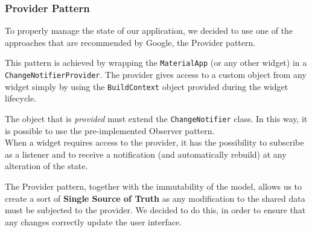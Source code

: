 \subsubsection{Provider Pattern}
\label{provider}
To properly manage the state of our application, we decided to use one of the approaches that are recommended by Google, the Provider pattern.

This pattern is achieved by wrapping the \texttt{MaterialApp} (or any other widget) in a \texttt{ChangeNotifierProvider}.
The provider gives access to a custom object from any widget simply by using the \texttt{BuildContext} object provided during the widget lifecycle.

The object that is \emph{provided} must extend the \texttt{ChangeNotifier} class. In this way, it is possible to use the pre-implemented Observer pattern.\\
When a widget requires access to the provider, it has the possibility to subscribe as a listener and to receive a notification (and automatically rebuild) at any alteration of the state.

The Provider pattern, together with the immutability of the model, allows us to create a sort of \textbf{Single Source of Truth} as any modification to the shared data must be subjected to the provider.
We decided to do this, in order to ensure that any changes correctly update the user interface.

